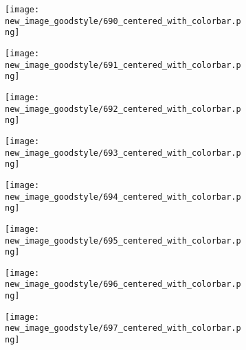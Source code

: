 \documentclass[a4paper,12pt]{article}
\begin{document}
\begin{figure}[H]
  \begin{subfigure}{0.11\textwidth}
    \texttt{[image: new\_image\_goodstyle/690\_centered\_with\_colorbar.png]}
  \end{subfigure}
  \hfill
  \begin{subfigure}{0.11\textwidth}
    \texttt{[image: new\_image\_goodstyle/691\_centered\_with\_colorbar.png]}
  \end{subfigure}
  \hfill
  \begin{subfigure}{0.11\textwidth}
    \texttt{[image: new\_image\_goodstyle/692\_centered\_with\_colorbar.png]}
  \end{subfigure}
  \hfill
  \begin{subfigure}{0.11\textwidth}
    \texttt{[image: new\_image\_goodstyle/693\_centered\_with\_colorbar.png]}
  \end{subfigure}
  \hfill
  \begin{subfigure}{0.11\textwidth}
    \texttt{[image: new\_image\_goodstyle/694\_centered\_with\_colorbar.png]}
  \end{subfigure}
  \hfill
  \begin{subfigure}{0.11\textwidth}
    \texttt{[image: new\_image\_goodstyle/695\_centered\_with\_colorbar.png]}
  \end{subfigure}
  \hfill
  \begin{subfigure}{0.11\textwidth}
    \texttt{[image: new\_image\_goodstyle/696\_centered\_with\_colorbar.png]}
  \end{subfigure}
  \hfill
  \begin{subfigure}{0.11\textwidth}
    \texttt{[image: new\_image\_goodstyle/697\_centered\_with\_colorbar.png]}
  \end{subfigure}
  \hfill
\end{figure}
\end{document}
